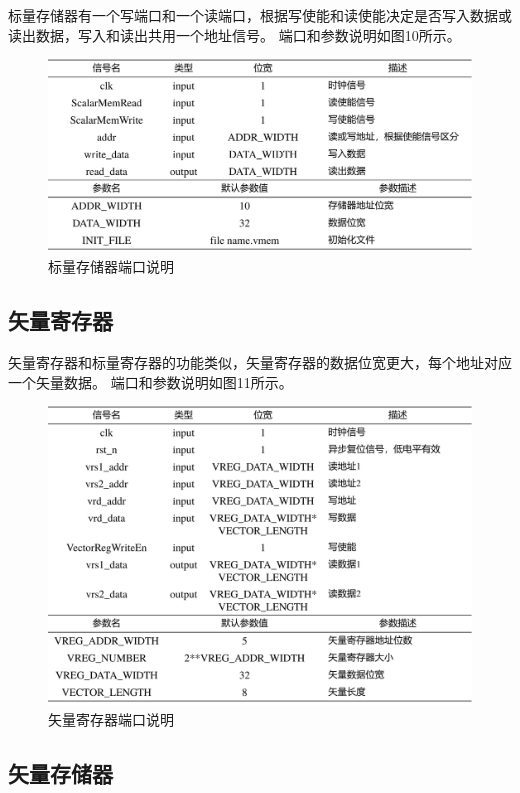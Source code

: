 \documentclass[UTF8]{ctexart}
\begin{document}
标量存储器有一个写端口和一个读端口，根据写使能和读使能决定是否写入数据或读出数据，写入和读出共用一个地址信号。
端口和参数说明如图10所示。

\begin{figure}[htbp]
    \centering
    \includegraphics[width=16cm]{pic/ScalarDCM.png}
    \caption{标量存储器端口说明}
\end{figure}

\subsection{矢量寄存器}

矢量寄存器和标量寄存器的功能类似，矢量寄存器的数据位宽更大，每个地址对应一个矢量数据。
端口和参数说明如图11所示。

\begin{figure}[htbp]
    \centering
    \includegraphics[width=16cm]{pic/VectorRF.png}
    \caption{矢量寄存器端口说明}
\end{figure}

\subsection{矢量存储器}
\end{document}
